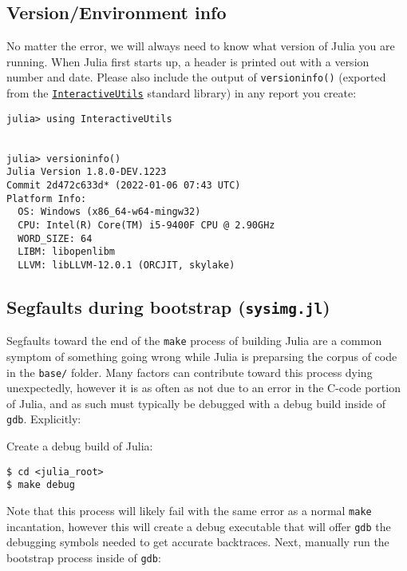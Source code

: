 \hypertarget{13046485394122703550}{}


\subsection{Version/Environment info}



No matter the error, we will always need to know what version of Julia you are running. When Julia first starts up, a header is printed out with a version number and date. Please also include the output of \texttt{versioninfo()} (exported from the \hyperlink{11698106121547091928}{\texttt{InteractiveUtils}} standard library) in any report you create:




\begin{verbatim}
julia> using InteractiveUtils


julia> versioninfo()
Julia Version 1.8.0-DEV.1223
Commit 2d472c633d* (2022-01-06 07:43 UTC)
Platform Info:
  OS: Windows (x86_64-w64-mingw32)
  CPU: Intel(R) Core(TM) i5-9400F CPU @ 2.90GHz
  WORD_SIZE: 64
  LIBM: libopenlibm
  LLVM: libLLVM-12.0.1 (ORCJIT, skylake)
\end{verbatim}



\hypertarget{3553581061539675492}{}


\subsection{Segfaults during bootstrap (\texttt{sysimg.jl})}



Segfaults toward the end of the \texttt{make} process of building Julia are a common symptom of something going wrong while Julia is preparsing the corpus of code in the \texttt{base/} folder.  Many factors can contribute toward this process dying unexpectedly, however it is as often as not due to an error in the C-code portion of Julia, and as such must typically be debugged with a debug build inside of \texttt{gdb}.  Explicitly:



Create a debug build of Julia:




\begin{lstlisting}
$ cd <julia_root>
$ make debug
\end{lstlisting}



Note that this process will likely fail with the same error as a normal \texttt{make} incantation, however this will create a debug executable that will offer \texttt{gdb} the debugging symbols needed to get accurate backtraces.  Next, manually run the bootstrap process inside of \texttt{gdb}:




